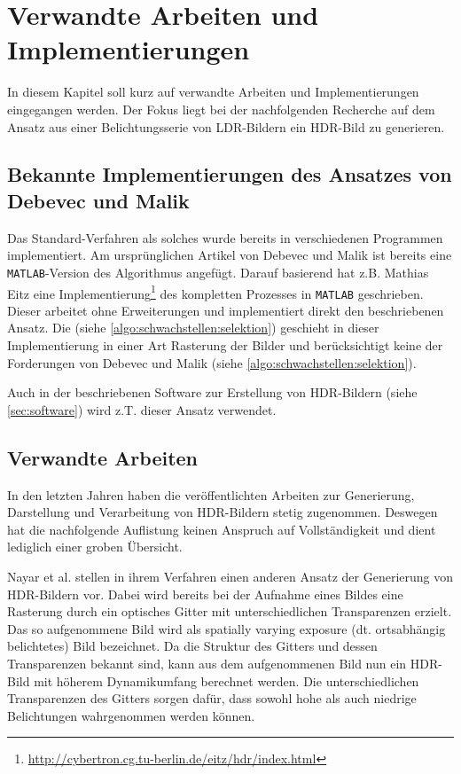 \chapter{Verwandte Arbeiten und Implementierungen}
\label{chap:references}

In diesem Kapitel soll kurz auf verwandte Arbeiten und Implementierungen eingegangen werden. Der Fokus liegt bei der nachfolgenden Recherche auf dem Ansatz aus einer Belichtungsserie von \gls{LDR}-Bildern ein \gls{HDR}-Bild zu generieren.

\section{Bekannte Implementierungen des Ansatzes von Debevec und Malik}
\label{sec:implementations}
Das Standard-Verfahren als solches wurde bereits in verschiedenen Programmen implementiert. Am ursprünglichen Artikel von Debevec und Malik ist bereits eine \texttt{MATLAB}-Version des Algorithmus angefügt. 
Darauf basierend hat z.B. Mathias Eitz eine Implementierung\footnote{\url{http://cybertron.cg.tu-berlin.de/eitz/hdr/index.html}} des kompletten Prozesses in \texttt{MATLAB} geschrieben. Dieser arbeitet ohne Erweiterungen und implementiert direkt den beschriebenen Ansatz. Die  (siehe \autoref{algo:schwachstellen:selektion}) geschieht in dieser Implementierung in einer Art Rasterung der Bilder und berücksichtigt keine der Forderungen von Debevec und Malik (siehe \autoref{algo:schwachstellen:selektion}). 

Auch in der beschriebenen Software zur Erstellung von \gls{HDR}-Bildern (siehe \autoref{sec:software}) wird z.T. dieser Ansatz verwendet.


\section{Verwandte Arbeiten}

In den letzten Jahren haben die veröffentlichten Arbeiten zur Generierung, Darstellung und Verarbeitung von \gls{HDR}-Bildern stetig zugenommen. Deswegen hat die nachfolgende Auflistung keinen Anspruch auf Vollständigkeit und dient lediglich einer groben Übersicht.

Nayar et al. \cite{Nayar00highdynamic} stellen in ihrem Verfahren einen anderen Ansatz der Generierung von \gls{HDR}-Bildern vor. Dabei wird bereits bei der Aufnahme eines Bildes eine Rasterung durch ein optisches Gitter mit unterschiedlichen Transparenzen erzielt. Das so aufgenommene Bild wird als spatially varying exposure (dt. ortsabhängig belichtetes) Bild bezeichnet. Da die Struktur des Gitters und dessen Transparenzen bekannt sind, kann aus dem aufgenommenen Bild nun ein \gls{HDR}-Bild mit höherem Dynamikumfang berechnet werden. Die unterschiedlichen Transparenzen des Gitters sorgen dafür, dass sowohl hohe als auch niedrige Belichtungen wahrgenommen werden können. 

